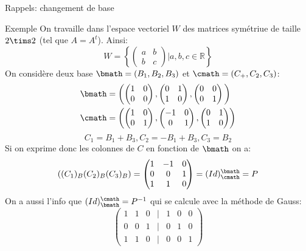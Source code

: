 \begin{parag}{Rappels: changement de base}
    \begin{subparag}{Exemple}
        On travaille dans l'espace vectoriel $W$ des matrices symétriue de taille $2 \tims 2$ (tel que $A = A^t$). Ainsi:
        \[W = \left\{ \begin{pmatrix}
            a & b \\ b & c
        \end{pmatrix}| a, b, c \in \mathbb{R} \right\}\]
        On considère deux base $\bmath = (B_1, B_2, B_3)$ et $\cmath = (C_+, C_2, C_3)$:
        \begin{align*}
            \bmath &= \left(\begin{pmatrix}
                1 & 0 \\ 0 & 0
            \end{pmatrix}, \begin{pmatrix}
                0 & 1 \\ 1 & 0
            \end{pmatrix}, \begin{pmatrix}
                0 & 0 \\ 0 & 1
            \end{pmatrix}\textbf{}\right) \\
            \cmath &= \left(\begin{pmatrix}
                1 & 0 \\0 & 1
            \end{pmatrix}, \begin{pmatrix}
                -1 & 0 \\ 0 & 1
            \end{pmatrix}, \begin{pmatrix}
                0 & 1 \\ 1 & 0
            \end{pmatrix}\right)
        \end{align*}
        \[C_1 = B_1 + B_3, C_2 = -B_1 +B_3 , C_3 = B_2 \]
        Si on exprime donc les colonnes de $C$ en fonction de $\bmath$ on a:
        \[\left((C_1)_B (C_2)_B (C_3)_B \right) = \begin{pmatrix}
            1 & -1 & 0 \\
            0 & 0 & 1\\
            1 & 1 & 0
        \end{pmatrix} = (Id)_\cmath^\bmath = P\]
        On a aussi l'info que $(Id)_\bmath^\cmath = P^{-1}$ qui se calcule avec la méthode de Gauss:
        \[\begin{pmatrix}
            1 & 1 & 0 & | & 1  & 0 & 0\\
            0 & 0 & 1 & | & 0 & 1 & 0 \\
            1 & 1 & 0 & | & 0 & 0 & 1
        \end{pmatrix}\]
    
    \end{subparag}
\end{parag}


